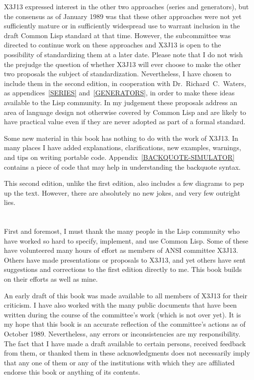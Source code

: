 X3J13 expressed interest in the other two approaches (series and generators),
but the consensus as of January 1989
was that these other approaches were not yet sufficiently mature or
in sufficiently widespread use to warrant inclusion in the draft Common Lisp
standard at that time.  However, the subcommittee was directed to continue work
on these approaches and X3J13 is open to the possibility of standardizing
them at a later date.
Please note that I do not wish the prejudge the
question of whether X3J13 will ever choose to make the other two proposals the
subject of standardization.  Nevertheless,
I have chosen to include them in the second edition,
in cooperation with Dr.~Richard~C.~Waters,
as appendices~\ref{SERIES} and~\ref{GENERATORS},
in order to make these ideas
available to the Lisp community.  In my judgement these proposals
address an area of language design not otherwise covered by Common Lisp
and are likely to have practical value even if they are never
adopted as part of a formal standard.

Some new material in this book has nothing to do with the work of X3J13.
In many places I have added explanations, clarifications, new examples,
warnings, and tips on writing portable code.
Appendix~\ref{BACKQUOTE-SIMULATOR} contains a piece of code
that may help in understanding the backquote syntax.

This second edition,
unlike the first edition, also includes a few diagrams to pep up the text.
However, there are absolutely no new jokes, and very few outright lies.


\chapter*{}


First and foremost, I must thank the many people in the Lisp
community who have worked so hard to specify, implement, and use
Common Lisp.  Some of these have volunteered many hours
of effort as members of ANSI committee X3J13.  Others
have made presentations or proposals to X3J13, and yet others
have sent suggestions and corrections to the first edition directly to me.
This book builds on their efforts as well as mine.


An early draft of this book was made available to all members
of X3J13 for their criticism.  I have also worked with
the many public documents that have been written during the course
of the committee's work (which is not over yet).
It is my hope that this book is an accurate reflection of the
committee's actions as of October 1989.
Nevertheless, any errors or inconsistencies are my responsibility.
The fact that I have made a draft available to certain persons,
received feedback from them, or thanked them in these
acknowledgments does not necessarily imply that any one of them
or any of the institutions with which they are affiliated endorse this book
or anything of its contents.

